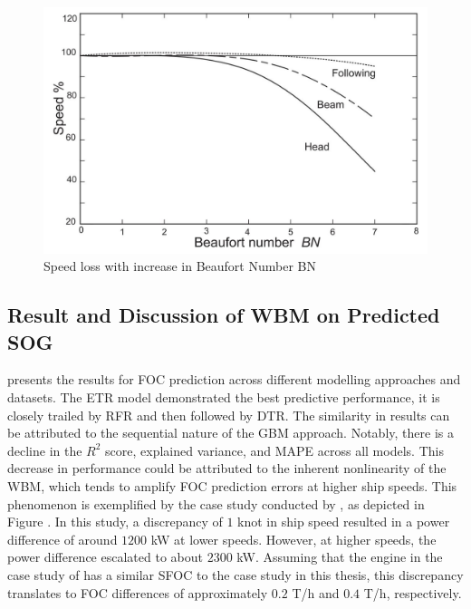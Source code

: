 \begin{figure}[ht]
    \centering
    \includegraphics[width=.7\linewidth]{02_figures/molland17_speedlosscurve.jpg}
    \caption{Speed loss with increase in Beaufort Number BN }
    \label{fig:molland17_speedloss_windwave}
\end{figure}

\subsection{Result and Discussion of WBM on Predicted SOG}\label{sec:WBM_result_discussion}

 presents the results for FOC prediction across different modelling approaches and datasets. The ETR model demonstrated the best predictive performance, it is closely trailed by RFR and then followed by DTR. The similarity in results can be attributed to the sequential nature of the GBM approach. Notably, there is a decline in the $R^2$ score, explained variance, and MAPE across all models. This decrease in performance could be attributed to the inherent nonlinearity of the WBM, which tends to amplify FOC prediction errors at higher ship speeds. This phenomenon is exemplified by the case study conducted by , as depicted in Figure . In this study, a discrepancy of $1$ knot in ship speed resulted in a power difference of around $1200$ kW at lower speeds. However, at higher speeds, the power difference escalated to about $2300$ kW. Assuming that the engine in the case study of  has a similar SFOC to the case study in this thesis, this discrepancy translates to FOC differences of approximately $0.2$ T/h and $0.4$ T/h, respectively.

